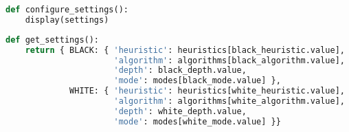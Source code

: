 \begin{lstlisting}[language=Python]
def configure_settings():
    display(settings)
\end{lstlisting}

\begin{lstlisting}[language=Python]
def get_settings():
    return { BLACK: { 'heuristic': heuristics[black_heuristic.value],
                      'algorithm': algorithms[black_algorithm.value],
                      'depth': black_depth.value,
                      'mode': modes[black_mode.value] },
             WHITE: { 'heuristic': heuristics[white_heuristic.value],
                      'algorithm': algorithms[white_algorithm.value],
                      'depth': white_depth.value,
                      'mode': modes[white_mode.value] }}
\end{lstlisting}
